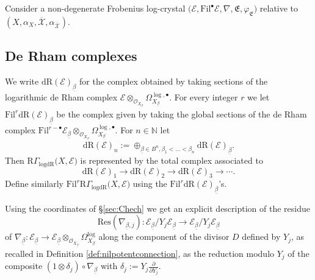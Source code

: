 \documentclass[asterisque,english]{smfart}
\begin{document}
Consider a non-degenerate Frobenius log-crystal $ \bigl(\mathcal{E},\mathrm{Fil}^\bullet \mathcal{E}, \nabla,\mathfrak{E},\varphi_{\mathfrak{E}}\bigr)$ relative to $(X,\alpha_X,\overline{\mathcal{X}},\alpha_{\overline{\mathcal{X}}})$.



\subsection{De Rham complexes}\label{sec:dR}

We write  $\mathrm{dR}(\mathcal{E})_{\underline{\beta}}$ for the  complex obtained by taking sections of the logarithmic de Rham complex  $\mathcal{E}\otimes_{\mathcal{O}_{X_{\underline{\beta}}}}  \Omega_{X_{\underline{\beta}}}^{\log,\bullet}$. For every integer $r$ we let $\mathrm{Fil}^r\mathrm{dR}(\mathcal{E})_{\underline{\beta}}$ be the complex given by taking  the global sections of the de Rham complex $\mathrm{Fil}^{r-\bullet} \mathcal{E}_{\underline {\beta}} \otimes_{\mathcal{O}_{X_{\underline{\beta}}}}  \Omega_{X_{\underline{\beta}}}^{\log,\bullet}$. For $n\in \mathbb{N}$ let $$\mathrm{dR}(\mathcal{E})_n:=\oplus_{\underline{\beta}\in B^n, \beta_1<\ldots <\beta_n} \mathrm{dR}(\mathcal{E})_{\underline{\beta}}.$$ Then $ \mathrm{R}\Gamma_{\mathrm{logdR}}\bigl(X, \mathcal{E}\bigr)$  is represented by the total complex associated to 
$$\mathrm{dR}(\mathcal{E})_1\longrightarrow \mathrm{dR}(\mathcal{E})_2 \longrightarrow \mathrm{dR}(\mathcal{E})_3 \longrightarrow \cdots. $$ Define similarly $\mathrm{Fil}^r \mathrm{R}\Gamma_{\mathrm{logdR}}\bigl(X, \mathcal{E}\bigr)$ using the $\mathrm{Fil}^r \mathrm{dR}(\mathcal{E})_{\underline{\beta}}$'s. 

Using the coordinates of \S \ref{sec:Chech} we get an explicit description of the residue $$\mathrm{Res}(\nabla_{\underline{\beta},j})\colon \mathcal{E}_{\underline{\beta}}/ Y_j \mathcal{E}_{\underline{\beta}}\longrightarrow \mathcal{E}_{\underline{\beta}}/Y_j \mathcal{E}_{\underline{\beta}}$$of $\nabla_{\underline{\beta}}\colon \mathcal{E}_{\underline{\beta}} \to  \mathcal{E}_{\underline{\beta}}\otimes_{\mathcal{O}_{X_{\underline{\beta}}}} \Omega_{X_{\underline{\beta}}}^{\log}$ along the component of the divisor $D$ defined by $Y_j$, as recalled in Definition \ref{def:nilpotentconnection}, as the reduction modulo $Y_j$ of the composite $(1 \otimes \delta_j)  \circ  \nabla_{\underline{\beta}} $ with $\delta_j:=Y_j \frac{\partial}{\partial Y_j} $.
\end{document}
